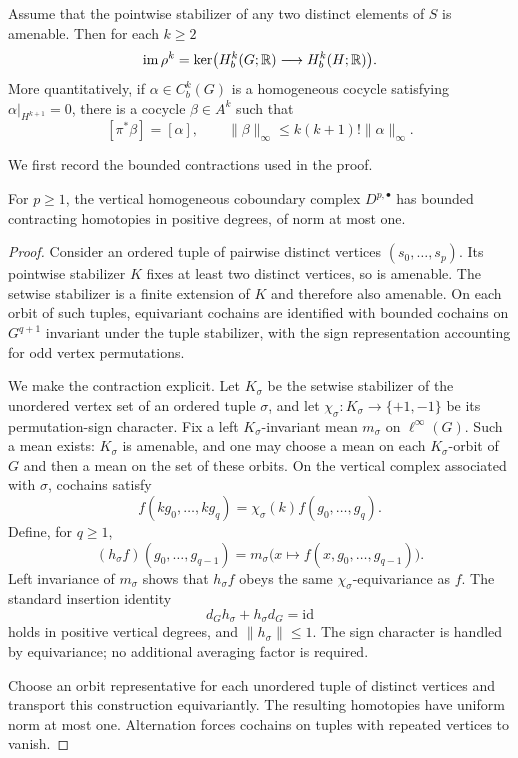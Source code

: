 \begin{theorem}\label{thm:bounded-lift}
Assume that the pointwise stabilizer of any two distinct
elements of $S$ is amenable. Then for each $k\geq2$
\begin{equation}\label{eq:bounded-image}
 \operatorname{im}\rho^k
 =\ker\bigl(H_b^k(G;\mathbb{R})\longrightarrow H_b^k(H;\mathbb{R})\bigr).
\end{equation}
More quantitatively, if $\alpha\in C_b^k(G)$ is a
homogeneous cocycle satisfying
$\alpha|_{H^{k+1}}=0$, there is a cocycle $\beta\in A^k$
such that
\[
 [\pi^*\beta]=[\alpha],\qquad
 \|\beta\|_\infty\leq k(k+1)!\|\alpha\|_\infty.
\]
\end{theorem}

We first record the bounded contractions used in the proof.

\begin{lemma}\label{lem:bounded-vertical}
For $p\geq1$, the vertical homogeneous coboundary complex
$D^{p,\bullet}$ has bounded contracting homotopies
in positive degrees, of norm at most one.
\end{lemma}

\begin{proof}
Consider an ordered tuple of pairwise distinct vertices
$(s_0,\ldots,s_p)$. Its pointwise stabilizer $K$ fixes
at least two distinct vertices, so is amenable.
The setwise stabilizer is a finite extension of $K$
and therefore also amenable. On each orbit of such
tuples, equivariant cochains are identified with bounded
cochains on $G^{q+1}$ invariant under the tuple stabilizer,
with the sign representation accounting for odd vertex
permutations.

We make the contraction explicit. Let $K_\sigma$
be the setwise stabilizer of the unordered vertex set
of an ordered tuple $\sigma$, and let
$\chi_\sigma:K_\sigma\to\{+1,-1\}$ be its permutation-sign
character. Fix a left $K_\sigma$-invariant mean
$m_\sigma$ on $\ell^\infty(G)$. Such a mean exists:
$K_\sigma$ is amenable, and one may choose a mean on
each $K_\sigma$-orbit of $G$ and then a mean on the
set of these orbits. On the vertical complex associated
with $\sigma$, cochains satisfy
\[
 f(kg_0,\ldots,kg_q)
  =\chi_\sigma(k)f(g_0,\ldots,g_q).
\]
Define, for $q\geq1$,
\[
 (h_\sigma f)(g_0,\ldots,g_{q-1})
  =m_\sigma\bigl(x\mapsto
       f(x,g_0,\ldots,g_{q-1})\bigr).
\]
Left invariance of $m_\sigma$ shows that
$h_\sigma f$ obeys the same $\chi_\sigma$-equivariance
as $f$. The standard insertion identity
\[
 d_Gh_\sigma+h_\sigma d_G=\mathrm{id}
\]
holds in positive vertical degrees, and
$\|h_\sigma\|\leq1$. The sign character is
handled by equivariance; no additional
averaging factor is required.

Choose an orbit representative for each unordered
tuple of distinct vertices and transport this
construction equivariantly. The resulting
homotopies have uniform norm at most one.
Alternation forces cochains on tuples with
repeated vertices to vanish.
\end{proof}

